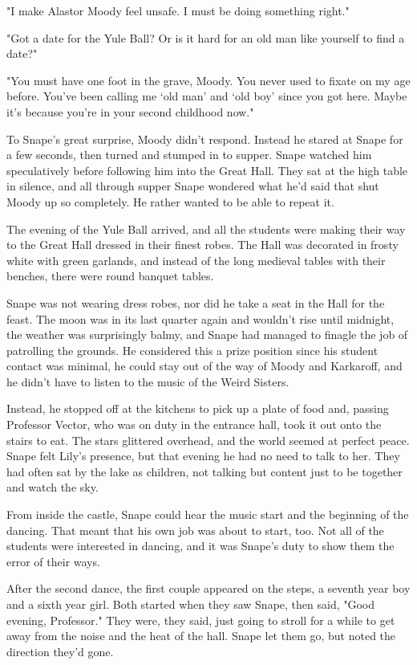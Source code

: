\documentclass[a4paper,11pt]{article}
\begin{document}
"I make Alastor Moody feel unsafe. I must be doing something right."

"Got a date for the Yule Ball? Or is it hard for an old man like yourself to find a date?"

"You must have one foot in the grave, Moody. You never used to fixate on my age before. You've been calling me `old man' and `old boy' since you got here. Maybe it's because you're in your second childhood now."

To Snape's great surprise, Moody didn't respond. Instead he stared at Snape for a few seconds, then turned and stumped in to supper. Snape watched him speculatively before following him into the Great Hall. They sat at the high table in silence, and all through supper Snape wondered what he'd said that shut Moody up so completely. He rather wanted to be able to repeat it.

The evening of the Yule Ball arrived, and all the students were making their way to the Great Hall dressed in their finest robes. The Hall was decorated in frosty white with green garlands, and instead of the long medieval tables with their benches, there were round banquet tables.

Snape was not wearing dress robes, nor did he take a seat in the Hall for the feast. The moon was in its last quarter again and wouldn't rise until midnight, the weather was surprisingly balmy, and Snape had managed to finagle the job of patrolling the grounds. He considered this a prize position since his student contact was minimal, he could stay out of the way of Moody and Karkaroff, and he didn't have to listen to the music of the Weird Sisters.

Instead, he stopped off at the kitchens to pick up a plate of food and, passing Professor Vector, who was on duty in the entrance hall, took it out onto the stairs to eat. The stars glittered overhead, and the world seemed at perfect peace. Snape felt Lily's presence, but that evening he had no need to talk to her. They had often sat by the lake as children, not talking but content just to be together and watch the sky.

From inside the castle, Snape could hear the music start and the beginning of the dancing. That meant that his own job was about to start, too. Not all of the students were interested in dancing, and it was Snape's duty to show them the error of their ways.

After the second dance, the first couple appeared on the steps, a seventh year boy and a sixth year girl. Both started when they saw Snape, then said, "Good evening, Professor." They were, they said, just going to stroll for a while to get away from the noise and the heat of the hall. Snape let them go, but noted the direction they'd gone.
\end{document}

